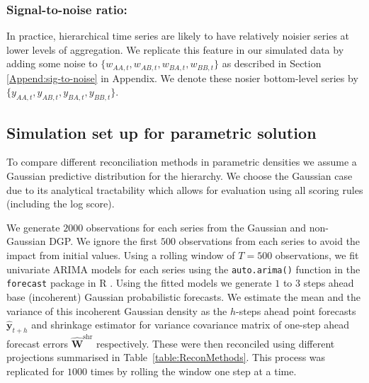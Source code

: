 \documentclass[12pt]{article}
\theoremstyle{definition}
\begin{document}
%

\subsubsection*{Signal-to-noise ratio:}

In practice, hierarchical time series are likely to have relatively noisier series at lower levels of aggregation. We replicate this feature in our simulated data by adding some noise to $\{w_{AA,t},w_{AB,t},w_{BA,t},w_{BB,t}\}$ as described in Section \ref{Append:sig-to-noise} in Appendix. We denote these nosier bottom-level series by $\{y_{AA,t},y_{AB,t},y_{BA,t},y_{BB,t}\}$. 


\subsection{Simulation set up for parametric solution}

To compare different reconciliation methods in parametric densities we assume a Gaussian predictive distribution for the hierarchy. We choose the Gaussian case due to its analytical tractability which allows for evaluation using all scoring rules (including the log score).

We generate $2000$ observations for each series from the Gaussian and non-Gaussian DGP. We ignore the first $500$ observations from each series to avoid the impact from initial values. Using a rolling window of $T=500$ observations, we fit univariate ARIMA models for each series using the \verb|auto.arima()| function in the \verb|forecast| package \citep{Rforecast} in R \citep{Rcore}. Using the fitted models we generate $1$ to $3$ steps ahead base (incoherent) Gaussian probabilistic forecasts. We estimate the mean and the variance of this incoherent Gaussian density as the $h$-steps ahead point forecasts $\hat{\bm{y}}_{t+h}$ and shrinkage estimator for variance covariance matrix of one-step ahead forecast errors $\hat{\bm{W}}^{\text{shr}}$ respectively. These were then reconciled using different projections summarised in Table~\ref{table:ReconMethods}. This process was replicated for $1000$ times by rolling the window one step at a time.
\end{document}
